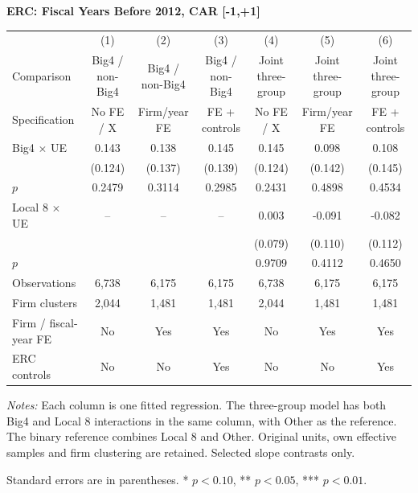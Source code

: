 \documentclass[10pt]{article}
\begin{document}
\begin{minipage}{23.60cm}
\fontsize{10}{12}\selectfont
\setlength{\tabcolsep}{4pt}\renewcommand{\arraystretch}{1.08}
{\large\bfseries ERC: Fiscal Years Before 2012, CAR [-1,+1]}\par\medskip
\begin{tabular*}{\linewidth}{@{\extracolsep{\fill}}lcccccc@{}}
\toprule
 & (1) & (2) & (3) & (4) & (5) & (6) \\
Comparison & Big4 / non-Big4 & Big4 / non-Big4 & Big4 / non-Big4 & Joint three-group & Joint three-group & Joint three-group \\
Specification & No FE / X & Firm/year FE & FE + controls & No FE / X & Firm/year FE & FE + controls \\
\midrule
Big4 $\times$ UE & 0.143 & 0.138 & 0.145 & 0.145 & 0.098 & 0.108 \\
 & (0.124) & (0.137) & (0.139) & (0.124) & (0.142) & (0.145) \\
$p$ & 0.2479 & 0.3114 & 0.2985 & 0.2431 & 0.4898 & 0.4534 \\
Local 8 $\times$ UE & -- & -- & -- & 0.003 & -0.091 & -0.082 \\
 &  &  &  & (0.079) & (0.110) & (0.112) \\
$p$ &  &  &  & 0.9709 & 0.4112 & 0.4650 \\
\midrule
Observations & 6,738 & 6,175 & 6,175 & 6,738 & 6,175 & 6,175 \\
Firm clusters & 2,044 & 1,481 & 1,481 & 2,044 & 1,481 & 1,481 \\
Firm / fiscal-year FE & No & Yes & Yes & No & Yes & Yes \\
ERC controls & No & No & Yes & No & No & Yes \\
\bottomrule\end{tabular*}\par\medskip
\fontsize{9}{11}\selectfont\textit{Notes:} Each column is one fitted regression. The three-group model has both Big4 and Local 8 interactions in the same column, with Other as the reference. The binary reference combines Local 8 and Other. Original units, own effective samples and firm clustering are retained. Selected slope contrasts only.
\par Standard errors are in parentheses. * $p<0.10$, ** $p<0.05$, *** $p<0.01$.
\end{minipage}
\end{document}
